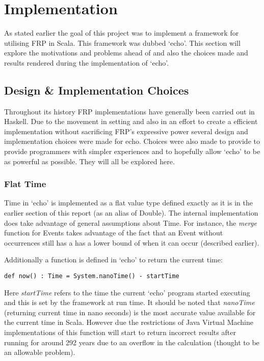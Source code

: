 \chapter{Implementation}
  As stated earlier the goal of this project was to implement a framework for utilising FRP in Scala. 
  This framework was dubbed `echo'. This section will explore the motivations and problems ahead of
  and also the choices made and results rendered during the implementation of `echo'.
  
  \section{Design \& Implementation Choices}
  Throughout its history FRP implementations have generally been carried out in Haskell. Due to the movement
  in setting and also in an effort to create a efficient implementation without sacrificing FRP's expressive power
  several design and implementation choices were made for echo. Choices were also made
  to provide to provide programmers with simpler experiences and to hopefully allow `echo' to be
  as powerful as possible. They will all be explored here.
  
    \subsection{Flat Time}
      Time in `echo' is implemented as a flat value type defined exactly as it is in the earlier
      section of this report (as an alias of Double). The internal implementation does take advantage
      of general assumptions about Time. For instance, the \emph{merge} function for Events takes advantage
      of the fact that an Event without occurrences still has a has a lower bound of when it can occur (described
      earlier). 
      
      Additionally a function is defined in `echo' to return the current time:
      
\begin{verbatim}
def now() : Time = System.nanoTime() - startTime
\end{verbatim}      

      Here \emph{startTime} refers to the time the current `echo' program started executing and this is
      set by the framework at run time. It should be noted that \emph{nanoTime} (returning current time in
      nano seconds) is the most accurate value available for the current time in Scala. However due the restrictions
      of Java Virtual Machine implementations of this function will start to return incorrect results 
      after running for around 292 years due to an overflow in the calculation (thought to be an allowable
      problem).
      
